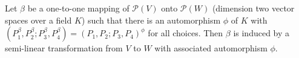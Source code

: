 Let $\beta$ be a one-to-one mapping of $\mathcal{P}(V)$ onto $\mathcal{P}(W)$ (dimension two vector spaces over a field $K$) such that there is an automorphism $\phi$ of $K$ with $(P_1^\beta, P_2^\beta; P_3^\beta, P_4^\beta) = (P_1, P_2; P_3, P_4)^\phi$ for all choices. Then $\beta$ is induced by a semi-linear transformation from $V$ to $W$ with associated automorphism $\phi$.
